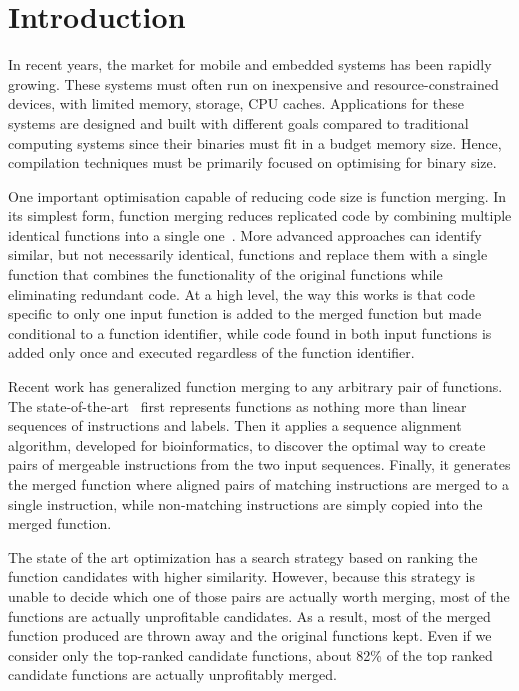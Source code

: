 \section{Introduction}
\label{sec:introduction}


In recent years, the market for mobile and embedded systems has been rapidly growing.
These systems must often run on inexpensive and resource-constrained devices, with limited memory, storage, CPU caches. %
Applications for these systems are designed and built with different goals compared to traditional computing systems since their binaries must fit in a budget memory size.
Hence, compilation techniques must be primarily focused on optimising for binary size.


One important optimisation capable of reducing code size is function merging.
In its simplest form, function merging reduces replicated code by combining multiple identical functions into a single one~\cite{llvm-fm,livska14}.
More advanced approaches can identify similar, but not necessarily identical, functions and replace them with a single function that combines the functionality of the original functions while eliminating redundant code.
At a high level, the way this works is that code specific to only one input function is added to the merged function but made conditional to a function identifier, while code found in both input functions is added only once and executed regardless of the function identifier.

Recent work has generalized function merging to any arbitrary pair of functions.
The state-of-the-art~\cite{rocha19, rocha20} first represents functions as nothing more
than linear sequences of instructions and labels.
Then it applies a sequence alignment algorithm, developed for bioinformatics, to discover
the optimal way to create pairs of mergeable instructions from the two input
sequences.
Finally, it generates the merged function where aligned pairs of matching
instructions are merged to a single instruction, while non-matching instructions are simply copied into the merged function.

The state of the art optimization has a search strategy based on ranking the function candidates with higher similarity.
However, because this strategy is unable to decide which one of those pairs are actually worth merging,
most of the  functions are actually unprofitable candidates.
As a result, most of the merged function produced are thrown away and the original functions kept.
Even if we consider only the top-ranked candidate functions, about 82\% of the top ranked candidate functions are actually unprofitably merged.

